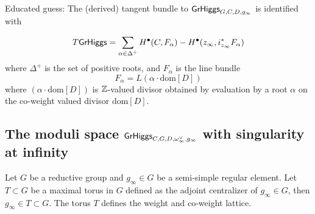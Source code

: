 \documentclass[12pt,psamsfonts,reqno]{amsart}
\begin{document}
\begin{remark}



Educated guess:  The (derived) tangent bundle to $\mathsf{GrHiggs}_{G,C,D,g_\infty}$ is identified with 


\begin{equation}
\label{eq:THiggs}
    T \mathsf{GrHiggs} = \sum_{\alpha \in \Delta^{+}} H^{\bullet}(C, F_\alpha) - H^{\bullet}(z_{\infty}, i_{z_\infty}^{*} F_\alpha)
\end{equation}
where $\Delta^{+}$ is the set of positive roots, and $F_\alpha$ is the line bundle 
\begin{equation}
    F_\alpha = L(\alpha \cdot \mathrm{dom}[D])
\end{equation}
where $(\alpha \cdot \mathrm{dom}[ D ])$ is $\mathbb Z$-valued divisor obtained by evaluation by a root $\alpha$ on the co-weight valued divisor $\mathrm{dom}[D]$.

 


\subsection{The moduli space  $\mathsf{GrHiggs}_{C,G,D, \omega_{\infty}^{\vee}, g_\infty}$ with
  singularity at infinity}


\begin{definition}
  Let $G$ be a reductive group and $g_\infty \in G$ be a semi-simple
  regular element. Let $T \subset G$ be a maximal torus in $G$ defined as
 the adjoint centralizer of $g_\infty \in G$, then $g_\infty \in T \subset G$.
  The torus $T$ defines the weight and co-weight lattice.
  

\end{definition}
\end{remark}
\end{document}
